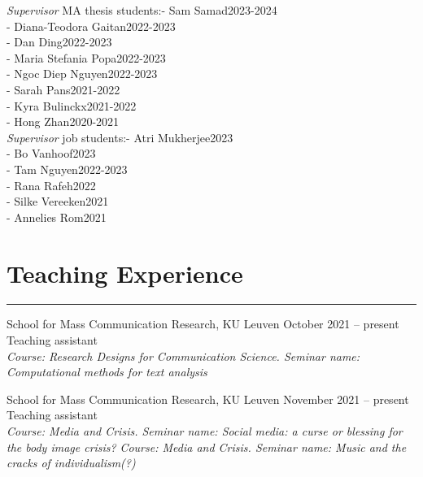 \documentclass[12pt,]{article}
\begin{document}
\emph{Supervisor} MA thesis students:\newline - Sam
Samad\hfill \begingroup\small 2023-2024\endgroup\\
- Diana-Teodora Gaitan\hfill \begingroup\small 2022-2023\endgroup\\
- Dan Ding\hfill \begingroup\small 2022-2023\endgroup\\
- Maria Stefania Popa\hfill \begingroup\small 2022-2023\endgroup\\
- Ngoc Diep Nguyen\hfill \begingroup\small 2022-2023\endgroup\\
- Sarah Pans\hfill \begingroup\small 2021-2022\endgroup\\
- Kyra Bulinckx\hfill \begingroup\small 2021-2022\endgroup\\
- Hong Zhan\hfill \begingroup\small 2020-2021\endgroup\\

\emph{Supervisor} job students:\newline - Atri
Mukherjee\hfill \begingroup\small 2023\endgroup\\
- Bo Vanhoof\hfill \begingroup\small 2023\endgroup\\
- Tam Nguyen\hfill \begingroup\small 2022-2023\endgroup\\
- Rana Rafeh\hfill \begingroup\small 2022\endgroup\\
- Silke Vereeken\hfill \begingroup\small 2021\endgroup\\
- Annelies Rom\hfill \begingroup\small 2021\endgroup\\

\hypertarget{teaching-experience}{%
\section{Teaching Experience}\label{teaching-experience}}

\vspace{-10pt}
\rule{1\linewidth}{\linethickness}

School for Mass Communication Research, KU Leuven
\hfill \begingroup\small October 2021 -- present\endgroup\\
Teaching assistant\\
\emph{Course: Research Designs for Communication Science. Seminar name:
Computational methods for text analysis}

School for Mass Communication Research, KU Leuven
\hfill \begingroup\small November 2021 -- present\endgroup\\
Teaching assistant\\
\emph{Course: Media and Crisis. Seminar name: Social media: a curse or
blessing for the body image crisis?} \emph{Course: Media and Crisis.
Seminar name: Music and the cracks of individualism(?)}
\end{document}
